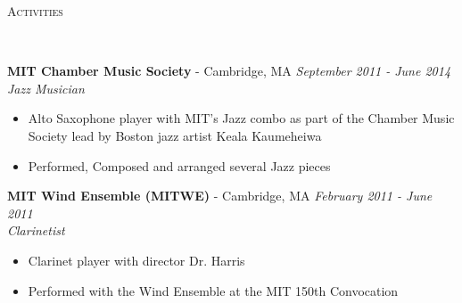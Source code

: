 \documentclass{article}
\newenvironment{changemargin}[2]{%
  \begin{list}{}{%
    \setlength{\topsep}{0pt}%
    \setlength{\leftmargin}{#1}%
    \setlength{\rightmargin}{#2}%
    \setlength{\listparindent}{\parindent}%
    \setlength{\itemindent}{\parindent}%
    \setlength{\parsep}{\parskip}%
  }%
  \item[]}{\end{list}
}
\newcommand{\lineover}{
	\begin{changemargin}{-0.05in}{-0.05in}
		\vspace*{-8pt}
		\hrulefill \\
		\vspace*{-2pt}
	\end{changemargin}
}
\newcommand{\header}[1]{
	\begin{changemargin}{-0.5in}{-0.5in}
		\scshape{#1}\\
  	\lineover
	\end{changemargin}
}
\newenvironment{body} {
	\vspace*{-16pt}
	\begin{changemargin}{-0.25in}{-0.5in}
  }	
	{\end{changemargin}
}
\begin{document}
\begin{body}
	\vspace{5pt}

\end{body}

\newpage

\header{Activities}

\begin{body}
	\vspace{16pt}
    \textbf{MIT Chamber Music Society} - Cambridge, MA \hfill \emph{September 2011 - June 2014}\\
	\emph{Jazz Musician}\\
	\vspace*{-3pt}
	\begin{itemize} \itemsep -2pt  %
    	\item Alto Saxophone player with MIT's Jazz combo as part of the Chamber Music Society lead by Boston jazz artist 
		Keala Kaumeheiwa
        \item Performed, Composed and arranged several Jazz pieces
	\end{itemize}
	\vspace{5 pt}
    
    \textbf{MIT Wind Ensemble (MITWE)} - Cambridge, MA \hfill \emph{February 2011 - June 2011}\\
	\emph{Clarinetist}\\
	\vspace*{-3pt}
	\begin{itemize} \itemsep -2pt  %
    	\item Clarinet player with director Dr. Harris
        \item Performed with the Wind Ensemble at the MIT 150th Convocation 
	\end{itemize}
	\vspace{5 pt}
    
\end{body}


	

    
\end{document}
